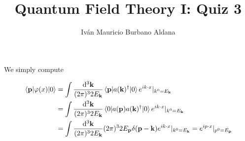 \documentclass{article}
\title{Quantum Field Theory I: Quiz 3}
\author{Iván Mauricio Burbano Aldana}
\begin{document}
\maketitle

We simply compute

\begin{equation}
\begin{aligned}
\mel{\vb{p}}{\varphi(x)}{0}&=\int\frac{\dd[3]\vb{k}}{(2\pi)^32E_{\vb{k}}}\mel{\vb{p}}{a(\vb{k})^\dagger}{0}e^{ik\cdot x}|_{k^0=E_{\vb{k}}}\\
&=\int\frac{\dd[3]\vb{k}}{(2\pi)^32E_{\vb{k}}}\mel{0}{a(\vb{p})a(\vb{k})^\dagger}{0}e^{ik\cdot x}|_{k^0=E_{\vb{k}}}\\
&=\int\frac{\dd[3]\vb{k}}{(2\pi)^32E_{\vb{k}}}(2\pi)^32E_{\vb{p}}\delta(\vb{p}-\vb{k})e^{ik\cdot x}|_{k^0=E_{\vb{k}}}=e^{ip\cdot x}|_{p^0=E_{\vb{p}}}
\end{aligned}
\end{equation}
\end{document}
